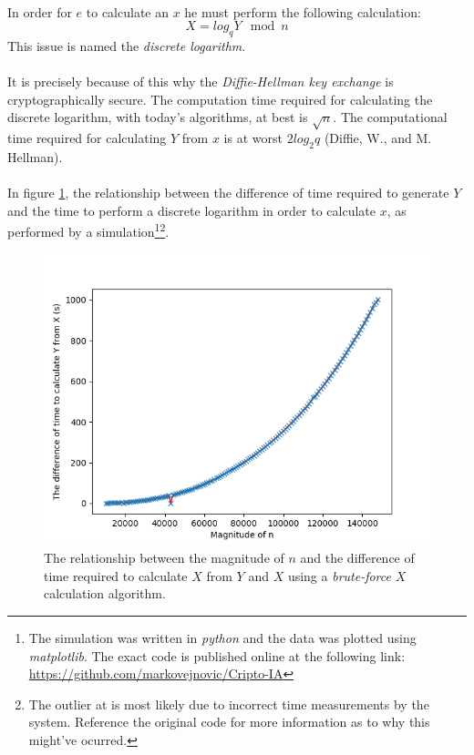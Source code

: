 \documentclass[a4paper, 12pt]{article}
\begin{document}
\paragraph*{}
In order for $e$ to calculate an $x$ he must perform the following calculation:
$$X = log_q Y \mod n$$
This issue is named the \textit{discrete logarithm}.

\paragraph*{}
It is precisely because of this why the \textit{Diffie-Hellman key exchange} is cryptographically secure. The 
computation time required for calculating the discrete logarithm, with today's algorithms, at best is $\sqrt{n}$.
The computational time required for calculating $Y$ from $x$ is at worst $2log_2 q$ (Diffie, W., and M. Hellman).

\paragraph*{}
In figure \ref{fig:n-xy-time}, the relationship between the difference of time required to generate $Y$ and the time 
to perform a discrete logarithm in order to calculate $x$, as performed by a simulation\footnote{The simulation was 
written in \textit{python} and the data was plotted using \textit{matplotlib}. The exact code is published online at 
the following link: \url{https://github.com/markovejnovic/Cripto-IA}}\footnote{The outlier at is most likely due to 
incorrect time measurements by the system. Reference the original code for more information as to why this might've 
ocurred.}.
\begin{figure}[ht]
\includegraphics[width=12cm]{n_xy-time_relationship}
\centering
\caption{The relationship between the magnitude of $n$ and the difference of time required to calculate $X$ from $Y$ 
and $X$ using a \textit{brute-force} $X$ calculation algorithm.}
\label{fig:n-xy-time}
\end{figure}
\end{document}
